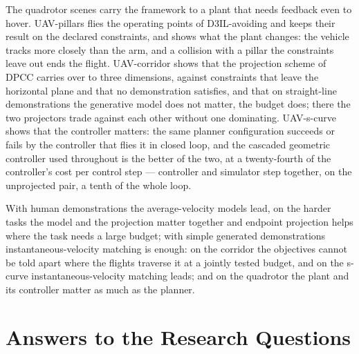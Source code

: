 The quadrotor scenes carry the framework to a plant that needs feedback even to hover. UAV-pillars flies
the operating points of D3IL-avoiding and keeps their result on the declared constraints, and shows
what the plant changes: the vehicle tracks more closely than the arm, and a collision with a pillar the
constraints leave out ends the flight. UAV-corridor shows that the projection scheme of \ac{DPCC}
carries over to three dimensions, against constraints that leave the horizontal plane and that no
demonstration satisfies, and that on straight-line demonstrations the generative model does not
matter, the budget does; there the two projectors trade against each other without one dominating.
UAV-s-curve shows that the controller matters: the same planner configuration succeeds or fails by
the controller that flies it in closed loop, and the cascaded geometric controller used throughout is
the better of the two, at a twenty-fourth of the controller's cost per control step --- controller
and simulator step together, on the unprojected pair, a tenth of the whole loop.

With human demonstrations the average-velocity models lead, on the harder tasks the model and the
projection matter together and endpoint projection helps where the task needs a large budget; with
simple generated demonstrations instantaneous-velocity matching is enough: on the corridor the
objectives cannot be told apart where the flights traverse it at a jointly tested budget, and on the
s-curve instantaneous-velocity matching leads; and on the quadrotor the plant and its controller
matter as much as the planner.

\section{Answers to the Research Questions}\label{sec:conc:rqs}

